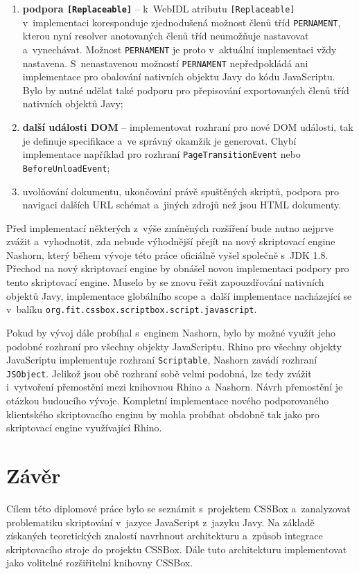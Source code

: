 \begin{enumerate}
  \item \textbf{podpora \texttt{[Replaceable]}} -- k~WebIDL atributu \texttt{[Replaceable]} v~implementaci koresponduje zjednodušená možnost členů tříd \texttt{PERNAMENT}, kterou nyní resolver anotovaných členů tříd neumožňuje nastavovat a~vynechávat. Možnost \texttt{PERNAMENT} je proto v~aktuální implementaci vždy nastavena. S~nenastavenou možností \texttt{PERNAMENT} nepředpokládá ani implementace pro obalování nativních objektu Javy do kódu JavaScriptu. Bylo by nutné udělat také podporu pro přepisování exportovaných členů tříd nativních objektů Javy;
  \item \textbf{další události DOM} -- implementovat rozhraní pro nové DOM události, tak je definuje specifikace a~ve správný okamžik je generovat. Chybí implementace například pro rozhraní \texttt{PageTransitionEvent} nebo \texttt{BeforeUnloadEvent};
  \item uvolňování dokumentu, ukončování právě spuštěných skriptů, podpora pro navigaci dalších URL schémat a~jiných zdrojů než jsou HTML dokumenty.
\end{enumerate}

Před implementací některých z~výše zmíněných rozšíření bude nutno nejprve zvážit a~vyhodnotit, zda nebude výhodnější přejít na nový skriptovací engine Nashorn, který během vývoje této práce oficiálně vyšel společně s~JDK 1.8. Přechod na nový skriptovací engine by obnášel novou implementaci podpory pro tento skriptovací engine. Muselo by se znovu řešit zapouzdřování nativních objektů Javy, implementace globálního scope  a~další implementace nacházející se v~balíku \texttt{org.fit.cssbox.scriptbox.script.javascript}.

Pokud by vývoj dále probíhal s~enginem Nashorn, bylo by možné využít jeho podobné rozhraní pro všechny objekty JavaScriptu. Rhino pro všechny objekty JavaScriptu implementuje rozhraní \texttt{Scriptable}, Nashorn zavádí rozhraní \texttt{JSObject}. Jelikož jsou obě rozhraní sobě velmi podobná, lze tedy zvážit i~vytvoření přemostění mezi knihovnou Rhino a~Nashorn. Návrh přemostění je otázkou budoucího vývoje. Kompletní implementace nového podporovaného klientského skriptovacího enginu by mohla probíhat obdobně tak jako pro skriptovací engine využívající Rhino.

\chapter{Závěr}
\label{Chapter.Final}

Cílem této diplomové práce bylo se seznámit s~projektem CSSBox a~zanalyzovat problematiku skriptování v~jazyce JavaScript z~jazyku Javy. Na základě získaných teoretických znalostí navrhnout architekturu a~způsob integrace skriptovacího stroje do projektu CSSBox. Dále tuto architekturu implementovat jako volitelné rozšiřitelní knihovny CSSBox. 

